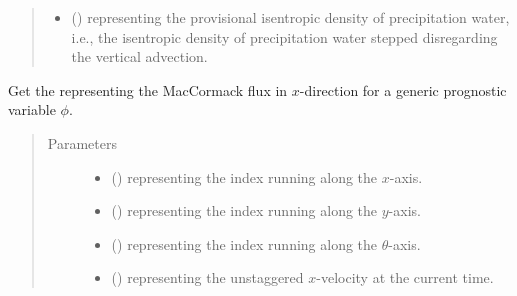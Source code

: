 \documentclass[letterpaper,10pt,english]{sphinxmanual}
\begin{document}
\begin{fulllineitems}
\begin{fulllineitems}
\begin{quote}
\begin{description}
\begin{itemize}
\item {} 
 () \textendash{}  representing the provisional isentropic density of precipitation water,
i.e., the isentropic density of precipitation water stepped disregarding the vertical advection.

\end{itemize}

\end{description}\end{quote}

\end{fulllineitems}


\begin{fulllineitems}
\label{\detokenize{api:dycore.flux_isentropic_maccormack.FluxIsentropicMacCormack._get_maccormack_flux_x}}
Get the  representing the MacCormack flux in \(x\)-direction for a
generic prognostic variable \(\phi\).
\begin{quote}\begin{description}
\item[{Parameters}] \leavevmode\begin{itemize}
\item {} 
 () \textendash{}  representing the index running along the \(x\)-axis.

\item {} 
 () \textendash{}  representing the index running along the \(y\)-axis.

\item {} 
 () \textendash{}  representing the index running along the \(\theta\)-axis.

\item {} 
 () \textendash{}  representing the unstaggered \(x\)-velocity at the current time.


\end{itemize}
\end{description}
\end{quote}
\end{fulllineitems}
\end{fulllineitems}
\end{document}
